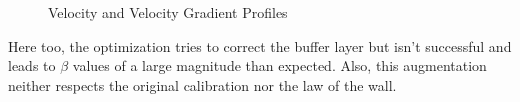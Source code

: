 \documentclass{article}
\begin{document}
\begin{figure}[H]
\caption{Velocity and Velocity Gradient Profiles}                                                                                       %
\label{vel2}                                                                                                     %
\end{figure}                                                                                                      %
Here too, the optimization tries to correct the buffer layer but isn't successful and leads to $\beta$ values of
a large magnitude than expected. Also, this augmentation neither respects the original calibration nor the law of the wall.
\end{document}
